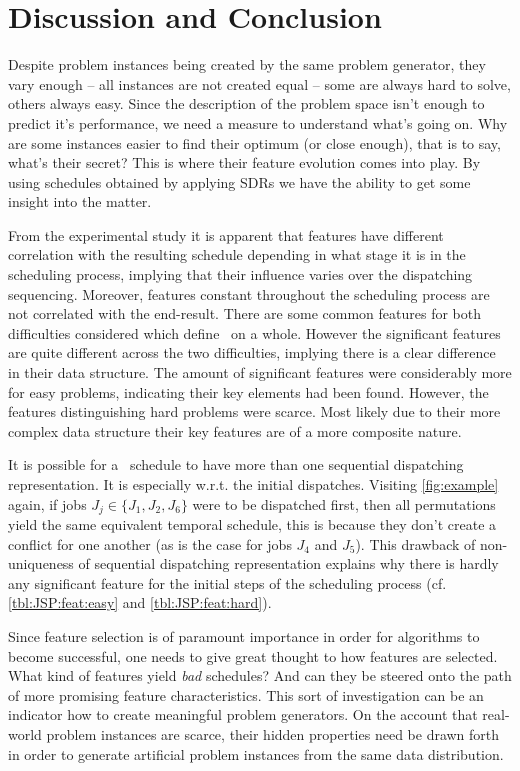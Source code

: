 \section{Discussion and Conclusion}
Despite problem instances being created by the same problem generator, they vary enough -- all instances are not created equal -- some are always hard to solve, others always easy. 
Since the description of the problem space isn't enough to predict it's performance, we need a measure to understand what's going on. Why are some instances easier to find their optimum (or close enough), that is to say, what's their secret? This is where their feature evolution comes into play.
By using schedules obtained by applying SDRs we have the ability to get some insight into the matter. 



From the experimental study it is apparent that features have different %
correlation with the resulting schedule depending in what stage it is in the scheduling process, implying that their influence varies over the dispatching sequencing. Moreover, features constant throughout the scheduling process are not correlated with the end-result.
There are some common features for both difficulties considered which define \JSP\ on a whole. However the significant features are quite different across the two difficulties, implying there is a clear difference in their data structure. The amount of significant features were considerably more for easy problems, indicating their key elements had been found. However, the features distinguishing hard problems were scarce. Most likely due to their more complex data structure their key features are of a more composite nature.

It is possible for a \JSP\ schedule to have more than one sequential dispatching representation. It is especially w.r.t. the initial dispatches. Visiting \cref{fig:example} again, if jobs $J_j\in\{J_1,J_2,J_6\}$ were to be dispatched first, then all permutations yield the same equivalent temporal schedule, this is because they don't create a conflict for one another (as is the case for jobs $J_4$ and $J_5$). This drawback of non-uniqueness of sequential dispatching representation explains why there is hardly any significant feature for the initial steps of the scheduling process (cf. \cref{tbl:JSP:feat:easy} and \cref{tbl:JSP:feat:hard}). 

Since feature selection is of paramount importance in order for algorithms to become successful, one needs to give great thought to how features are selected. What kind of features yield \emph{bad} schedules? And can they be steered onto the path of more promising feature characteristics. This sort of investigation can be an indicator how to create meaningful problem generators. On the account that real-world problem instances are scarce, their hidden properties need be drawn forth in order to generate artificial problem instances from the same data distribution. 

